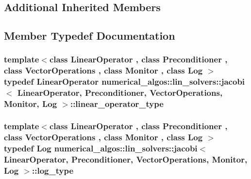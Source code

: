 \subsection*{Additional Inherited Members}


\subsection{Member Typedef Documentation}
\hypertarget{classnumerical__algos_1_1lin__solvers_1_1jacobi_adb16ec28c8268884b3649fefc44c4b51}{
\subsubsection[{linear\-\_\-operator\-\_\-type}]{\setlength{\rightskip}{0pt plus 5cm}template$<$class Linear\-Operator , class Preconditioner , class Vector\-Operations , class Monitor , class Log $>$ typedef Linear\-Operator {\bf numerical\-\_\-algos\-::lin\-\_\-solvers\-::jacobi}$<$ Linear\-Operator, Preconditioner, Vector\-Operations, Monitor, Log $>$\-::{\bf linear\-\_\-operator\-\_\-type}}}\label{classnumerical__algos_1_1lin__solvers_1_1jacobi_adb16ec28c8268884b3649fefc44c4b51}
\hypertarget{classnumerical__algos_1_1lin__solvers_1_1jacobi_ab93ff757d620bff642b65e8cc7e4b4e5}{
\subsubsection[{log\-\_\-type}]{\setlength{\rightskip}{0pt plus 5cm}template$<$class Linear\-Operator , class Preconditioner , class Vector\-Operations , class Monitor , class Log $>$ typedef Log {\bf numerical\-\_\-algos\-::lin\-\_\-solvers\-::jacobi}$<$ Linear\-Operator, Preconditioner, Vector\-Operations, Monitor, Log $>$\-::{\bf log\-\_\-type}}}\label{classnumerical__algos_1_1lin__solvers_1_1jacobi_ab93ff757d620bff642b65e8cc7e4b4e5}
